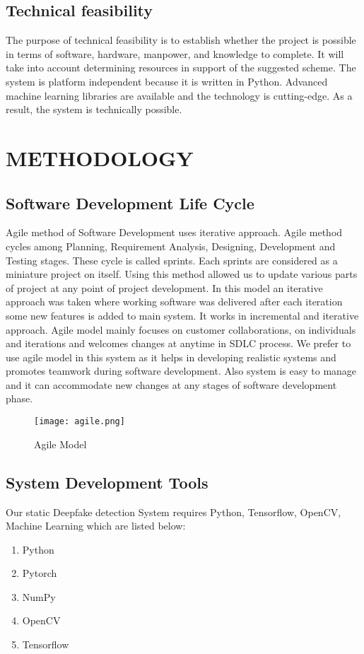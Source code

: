 \documentclass[12 pt]{article}
\begin{document}
\subsection{Technical feasibility}
The purpose of technical feasibility is to establish whether the project is possible in
terms of software, hardware, manpower, and knowledge to complete. It will take into
account determining resources in support of the suggested scheme. The system is
platform independent because it is written in Python. Advanced machine learning
libraries are available and the technology is cutting-edge. As a result, the system is
technically possible.
\newpage

\section{METHODOLOGY}
\subsection{Software Development Life Cycle}
\justify
Agile method of Software Development uses iterative approach. Agile method cycles
among Planning, Requirement Analysis, Designing, Development and Testing stages.
These cycle is called sprints. Each sprints are considered as a miniature project on itself.
Using this method allowed us to update various parts of project at any point of project
development. In this model an iterative approach was taken where working software
was delivered after each iteration some new features is added to main system. It works
in incremental and iterative approach. Agile model mainly focuses on customer
collaborations, on individuals and iterations and welcomes changes at anytime in
SDLC process. We prefer to use agile model in this system as it helps in developing
realistic systems and promotes teamwork during software development. Also system is
easy to manage and it can accommodate new changes at any stages of software
development phase. \\
\vspace{0.2 in}
\begin{figure}[h]
    \centering
    \texttt{[image: agile.png]}
    \caption{Agile Model}
\end{figure}

\newpage
\subsection{System Development Tools}
Our static Deepfake detection System requires Python, Tensorflow, OpenCV,
Machine Learning which are listed below:
\begin{enumerate}
    \item Python
    \item Pytorch
    \item NumPy
    \item OpenCV
    \item Tensorflow
\end{enumerate}
\end{document}

